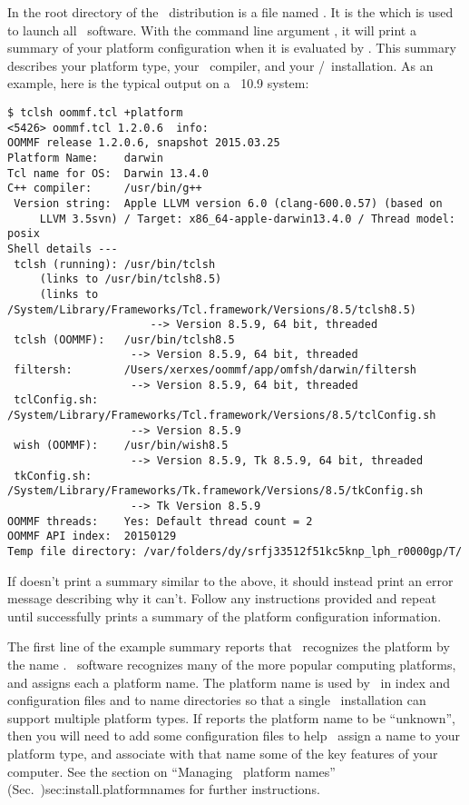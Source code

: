 In the root directory of the \OOMMF\ distribution is a file
named .  It is the
which is used to launch all \OOMMF\ software.  With the command line
argument ,
it will print a summary of your
platform configuration when it is evaluated by .
This summary describes your platform type, your \Cplusplus\ compiler,
and your \Tcl/\Tk\ installation.  As an example,
here is the typical output on a \MacOSX\ 10.9 system:
\begin{verbatim}
$ tclsh oommf.tcl +platform
<5426> oommf.tcl 1.2.0.6  info:
OOMMF release 1.2.0.6, snapshot 2015.03.25
Platform Name:    darwin
Tcl name for OS:  Darwin 13.4.0
C++ compiler:     /usr/bin/g++
 Version string:  Apple LLVM version 6.0 (clang-600.0.57) (based on
     LLVM 3.5svn) / Target: x86_64-apple-darwin13.4.0 / Thread model: posix
Shell details ---
 tclsh (running): /usr/bin/tclsh
     (links to /usr/bin/tclsh8.5)
     (links to /System/Library/Frameworks/Tcl.framework/Versions/8.5/tclsh8.5)
                      --> Version 8.5.9, 64 bit, threaded
 tclsh (OOMMF):   /usr/bin/tclsh8.5
                   --> Version 8.5.9, 64 bit, threaded
 filtersh:        /Users/xerxes/oommf/app/omfsh/darwin/filtersh
                   --> Version 8.5.9, 64 bit, threaded
 tclConfig.sh:    /System/Library/Frameworks/Tcl.framework/Versions/8.5/tclConfig.sh
                   --> Version 8.5.9
 wish (OOMMF):    /usr/bin/wish8.5
                   --> Version 8.5.9, Tk 8.5.9, 64 bit, threaded
 tkConfig.sh:     /System/Library/Frameworks/Tk.framework/Versions/8.5/tkConfig.sh
                   --> Tk Version 8.5.9
OOMMF threads:    Yes: Default thread count = 2
OOMMF API index:  20150129
Temp file directory: /var/folders/dy/srfj33512f51kc5knp_lph_r0000gp/T/
\end{verbatim}

If  doesn't print a summary similar to the
above, it should instead print an error message describing why it can't.
Follow any instructions provided
and repeat until  successfully prints a summary
of the platform configuration information.

The first line of the example summary reports that \OOMMF\ recognizes
the platform by the name .  \OOMMF\ software recognizes many
of the more popular computing platforms, and assigns each a platform
name.  The platform name is used by \OOMMF\ in index and configuration
files and to name directories so that a single \OOMMF\ installation can
support multiple platform types.  If  reports
the platform name to be ``unknown'', then you will need to add some
configuration files to help \OOMMF\ assign a name to your platform type,
and associate with that name some of the key features of your computer.
See the section on
{``Managing \OOMMF\ platform names'' (Sec.~}{)}{sec:install.platformnames}
for further instructions.

